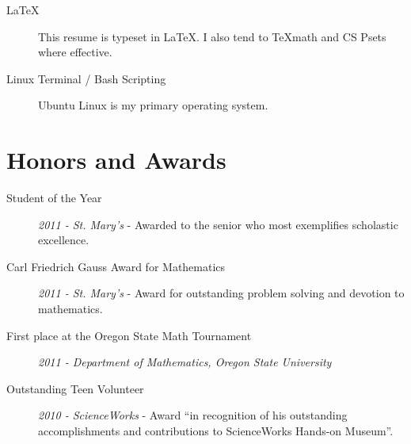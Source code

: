 \documentclass{res}
\begin{document}
\begin{resume}
\begin{description}
				\item[\LaTeX] This resume is typeset in \LaTeX. I also tend to \TeX \space math and CS Psets where effective.

				\item[Linux Terminal / Bash Scripting] Ubuntu Linux is my primary operating system.

			\end{description}

		\vspace{-5pt}
		\section{Honors and Awards}

			\begin{description}

				\item[Student of the Year] \textit{2011 - St. Mary's} - Awarded to the senior who most exemplifies scholastic excellence.

				\item[Carl Friedrich Gauss Award for Mathematics] \textit{2011 - St. Mary's} - Award for outstanding problem solving and devotion to mathematics.

				\item[First place at the Oregon State Math Tournament ] \textit{2011 - Department of Mathematics, Oregon State University}

				\item[Outstanding Teen Volunteer] \textit{2010 - ScienceWorks} - Award ``in recognition of his outstanding accomplishments and contributions
	to ScienceWorks Hands-on Museum''.

			\end{description}

	\end{resume}
\end{document}
